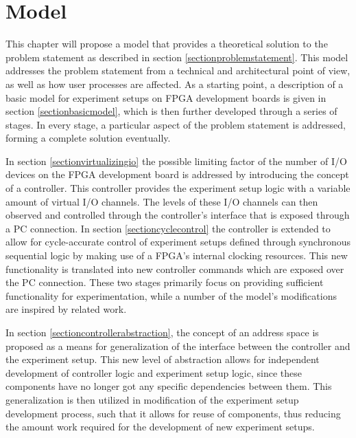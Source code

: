 \documentclass[main.tex]{subfiles}
\begin{document}
\chapter{Model}
\label{chapter:model}

This chapter will propose a model that provides a theoretical solution to the problem statement as described in section \ref{sectionproblemstatement}. This model addresses the problem statement from a technical and architectural point of view, as well as how user processes are affected. As a starting point, a description of a basic model for experiment setups on FPGA development boards is given in section \ref{sectionbasicmodel}, which is then further developed through a series of stages. In every stage, a particular aspect of the problem statement is addressed, forming a complete solution eventually.

In section \ref{sectionvirtualizingio} the possible limiting factor of the number of I/O devices on the FPGA development board is addressed by introducing the concept of a controller. This controller provides the experiment setup logic with a variable amount of virtual I/O channels. The levels of these I/O channels can then observed and controlled through the controller's interface that is exposed through a PC connection. In section \ref{sectioncyclecontrol} the controller is extended to allow for cycle-accurate control of experiment setups defined through synchronous sequential logic by making use of a FPGA's internal clocking resources. This new functionality is translated into new controller commands which are exposed over the PC connection. These two stages primarily focus on providing sufficient functionality for experimentation, while a number of the model's modifications are inspired by related work.

In section \ref{sectioncontrollerabstraction}, the concept of an address space is proposed as a means for generalization of the interface between the controller and the experiment setup. This new level of abstraction allows for independent development of controller logic and experiment setup logic, since these components have no longer got any specific dependencies between them. This generalization is then utilized in modification of the experiment setup development process, such that it allows for reuse of components, thus reducing the amount work required for the development of new experiment setups.
\end{document}
